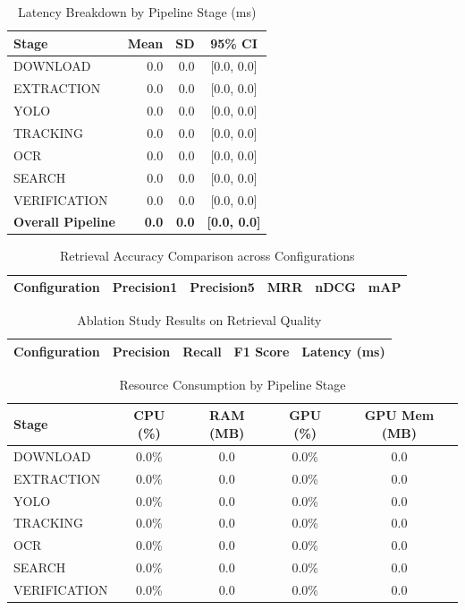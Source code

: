 
\begin{table}[h]
\caption{Latency Breakdown by Pipeline Stage (ms)}
\label{tab:latency}
\centering
\begin{tabular}{|l|r|r|c|}
\hline
Stage & Mean & SD & 95\% CI \\
\hline
DOWNLOAD & 0.0 & 0.0 & [0.0, 0.0] \\
EXTRACTION & 0.0 & 0.0 & [0.0, 0.0] \\
YOLO & 0.0 & 0.0 & [0.0, 0.0] \\
TRACKING & 0.0 & 0.0 & [0.0, 0.0] \\
OCR & 0.0 & 0.0 & [0.0, 0.0] \\
SEARCH & 0.0 & 0.0 & [0.0, 0.0] \\
VERIFICATION & 0.0 & 0.0 & [0.0, 0.0] \\
\hline
\textbf{Overall Pipeline} & \textbf{0.0} & \textbf{0.0} & \textbf{[0.0, 0.0]} \\
\hline
\end{tabular}
\end{table}

\begin{table}[h]
\caption{Retrieval Accuracy Comparison across Configurations}
\label{tab:retrieval}
\centering
\begin{tabular}{|l|c|c|c|c|c|}
\hline
Configuration & Precision\@1 & Precision\@5 & MRR & nDCG & mAP \\
\hline
\hline
\end{tabular}
\end{table}

\begin{table}[h]
\caption{Ablation Study Results on Retrieval Quality}
\label{tab:ablation}
\centering
\begin{tabular}{|l|c|c|c|c|}
\hline
Configuration & Precision & Recall & F1 Score & Latency (ms) \\
\hline
\hline
\end{tabular}
\end{table}

\begin{table}[h]
\caption{Resource Consumption by Pipeline Stage}
\label{tab:resources}
\centering
\begin{tabular}{|l|c|c|c|c|}
\hline
Stage & CPU (\%) & RAM (MB) & GPU (\%) & GPU Mem (MB) \\
\hline
DOWNLOAD & 0.0\% & 0.0 & 0.0\% & 0.0 \\
EXTRACTION & 0.0\% & 0.0 & 0.0\% & 0.0 \\
YOLO & 0.0\% & 0.0 & 0.0\% & 0.0 \\
TRACKING & 0.0\% & 0.0 & 0.0\% & 0.0 \\
OCR & 0.0\% & 0.0 & 0.0\% & 0.0 \\
SEARCH & 0.0\% & 0.0 & 0.0\% & 0.0 \\
VERIFICATION & 0.0\% & 0.0 & 0.0\% & 0.0 \\
\hline
\end{tabular}
\end{table}

